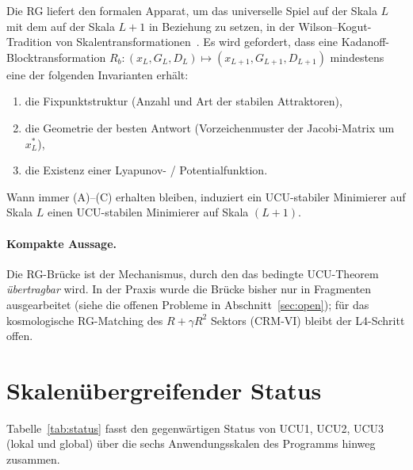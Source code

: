 \documentclass[11pt,a4paper]{article}
\theoremstyle{remark}
\begin{document}
Die RG liefert den formalen Apparat, um das universelle Spiel auf der Skala $L$ mit dem auf der Skala $L+1$ in Beziehung zu setzen, in der Wilson--Kogut-Tradition von Skalentransformationen~\cite{Wilson1974}. Es wird gefordert, dass eine Kadanoff-Blocktransformation $R_b : (x_L, G_L, D_L) \mapsto (x_{L+1}, G_{L+1}, D_{L+1})$ mindestens eine der folgenden Invarianten erhält:
\begin{enumerate}[label=(\Alph*),leftmargin=2em]
\item die Fixpunktstruktur (Anzahl und Art der stabilen Attraktoren),
\item die Geometrie der besten Antwort (Vorzeichenmuster der Jacobi-Matrix um $x_L^*$),
\item die Existenz einer Lyapunov- / Potentialfunktion.
\end{enumerate}
Wann immer (A)--(C) erhalten bleiben, induziert ein UCU-stabiler Minimierer auf Skala $L$ einen UCU-stabilen Minimierer auf Skala $(L{+}1)$.

\paragraph{Kompakte Aussage.}
Die RG-Brücke ist der Mechanismus, durch den das bedingte UCU-Theorem \emph{übertragbar} wird. In der Praxis wurde die Brücke bisher nur in Fragmenten ausgearbeitet (siehe die offenen Probleme in Abschnitt~\ref{sec:open}); für das kosmologische RG-Matching des $R + \gamma R^2$ Sektors (CRM-VI) bleibt der L4-Schritt offen.

\section{Skalenübergreifender Status}
\label{sec:cross-scale}

Tabelle~\ref{tab:status} fasst den gegenwärtigen Status von UCU1, UCU2, UCU3 (lokal und global) über die sechs Anwendungsskalen des Programms hinweg zusammen.
\end{document}
